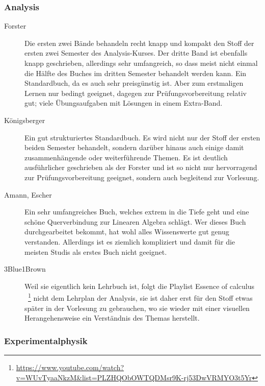 \subsubsection{Analysis}
\begin{description}
	\item[Forster]{
		Die ersten zwei Bände behandeln recht knapp und kompakt den Stoff der ersten zwei Semester des Analysis-Kurses. Der dritte Band ist ebenfalls knapp geschrieben, allerdings sehr umfangreich, so dass meist nicht einmal die Hälfte des Buches im dritten Semester behandelt werden kann. Ein Standardbuch, da es auch sehr preisgünstig ist. Aber zum erstmaligen Lernen nur bedingt geeignet, dagegen zur Prüfungsvorbereitung relativ gut; viele Übungsaufgaben mit Lösungen in einem Extra-Band.}
	
	\item[Königsberger]{
		Ein gut strukturiertes Standardbuch. Es wird nicht nur der Stoff der ersten beiden Semester behandelt, sondern darüber hinaus auch einige damit zusammenhängende oder weiterführende Themen. Es ist deutlich ausführlicher geschrieben als der Forster und ist so nicht nur hervorragend zur Prüfungsvorbereitung geeignet, sondern auch begleitend zur Vorlesung.}
	
	\item[Amann, Escher]{
		Ein sehr umfangreiches Buch, welches extrem in die Tiefe geht und eine schöne Querverbindung zur Linearen Algebra schlägt. Wer dieses Buch durchgearbeitet bekommt, hat wohl alles Wissenswerte gut genug verstanden. Allerdings ist es ziemlich kompliziert und damit für die meisten Studis als erstes Buch nicht geeignet.}
	\item[3Blue1Brown]
		Weil sie eigentlich kein Lehrbuch ist, folgt die Playlist \grqq Essence of calculus \grqq\ \footnote{\url{https://www.youtube.com/watch?v=WUvTyaaNkzM&list=PLZHQObOWTQDMsr9K-rj53DwVRMYO3t5Yr}} nicht dem Lehrplan der Analysis, sie ist daher erst für den Stoff etwas später in der Vorlesung zu gebrauchen, wo sie wieder mit einer visuellen Herangehensweise ein Verständnis des Themas herstellt.
\end{description}

\vspace{-1mm}

\subsubsection{Experimentalphysik}

